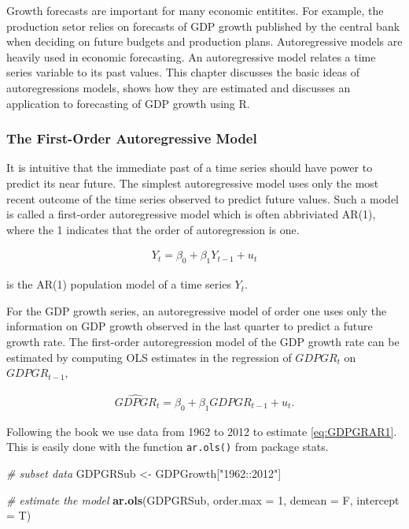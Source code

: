 \documentclass[]{book}
\newenvironment{Shaded}{\begin{snugshade}}{\end{snugshade}}
\newcommand{\KeywordTok}[1]{\textcolor[rgb]{0.13,0.29,0.53}{\textbf{#1}}}
\newcommand{\DataTypeTok}[1]{\textcolor[rgb]{0.13,0.29,0.53}{#1}}
\newcommand{\DecValTok}[1]{\textcolor[rgb]{0.00,0.00,0.81}{#1}}
\newcommand{\StringTok}[1]{\textcolor[rgb]{0.31,0.60,0.02}{#1}}
\newcommand{\CommentTok}[1]{\textcolor[rgb]{0.56,0.35,0.01}{\textit{#1}}}
\newcommand{\NormalTok}[1]{#1}
\theoremstyle{definition}
\theoremstyle{definition}
\theoremstyle{definition}
\theoremstyle{remark}
\begin{document}
Growth forecasts are important for many economic entitites. For example,
the production setor relies on forecasts of GDP growth published by the
central bank when deciding on future budgets and production plans.
Autoregressive models are heavily used in economic forecasting. An
autoregressive model relates a time series variable to its past values.
This chapter discusses the basic ideas of autoregressions models, shows
how they are estimated and discusses an application to forecasting of
GDP growth using R.

\subsubsection*{The First-Order Autoregressive
Model}\label{the-first-order-autoregressive-model}

It is intuitive that the immediate past of a time series should have
power to predict its near future. The simplest autoregressive model uses
only the most recent outcome of the time series observed to predict
future values. Such a model is called a first-order autoregressive model
which is often abbriviated AR(1), where the 1 indicates that the order
of autoregression is one.

\begin{align*}
  Y_t = \beta_0 + \beta_1 Y_{t-1} + u_t
\end{align*}

is the AR(1) population model of a time series \(Y_t\).

For the GDP growth series, an autoregressive model of order one uses
only the information on GDP growth observed in the last quarter to
predict a future growth rate. The first-order autoregression model of
the GDP growth rate can be estimated by computing OLS estimates in the
regression of \(GDPGR_t\) on \(GDPGR_{t-1}\),

\begin{align}
  \widehat{GDPGR}_t = \beta_0 + \beta_1 GDPGR_{t-1} + u_t. \label{eq:GDPGRAR1}
\end{align}

Following the book we use data from 1962 to 2012 to estimate
\eqref{eq:GDPGRAR1}. This is easily done with the function
\texttt{ar.ols()} from package stats.

\begin{Shaded}
\begin{Highlighting}[]
\CommentTok{# subset data}
\NormalTok{GDPGRSub <-}\StringTok{ }\NormalTok{GDPGrowth[}\StringTok{"1962::2012"}\NormalTok{]}

\CommentTok{# estimate the model}
\KeywordTok{ar.ols}\NormalTok{(GDPGRSub, }
       \DataTypeTok{order.max =} \DecValTok{1}\NormalTok{, }
       \DataTypeTok{demean =}\NormalTok{ F, }
       \DataTypeTok{intercept =}\NormalTok{ T)}
\end{Highlighting}
\end{Shaded}
\end{document}
